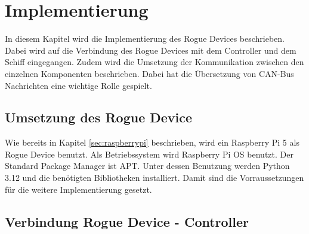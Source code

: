 \chapter{Implementierung}

In diesem Kapitel wird die Implementierung des Rogue Devices beschrieben. Dabei wird auf die Verbindung des Rogue Devices
mit dem Controller und dem Schiff eingegangen. Zudem wird die Umsetzung der Kommunikation zwischen den einzelnen Komponenten
beschrieben. Dabei hat die Übersetzung von CAN-Bus Nachrichten eine wichtige Rolle gespielt.

\section{Umsetzung des Rogue Device}
Wie bereits in Kapitel \ref{sec:raspberrypi} beschrieben, wird ein Raspberry Pi 5 als Rogue Device benutzt. 
Als Betriebssystem wird Raspberry Pi OS benutzt. Der Standard Package Manager ist APT. Unter dessen Benutzung werden 
Python 3.12 und die benötigten Bibliotheken installiert. Damit sind die Vorraussetzungen für die weitere Implementierung
gesetzt.

\section{Verbindung Rogue Device - Controller} 

